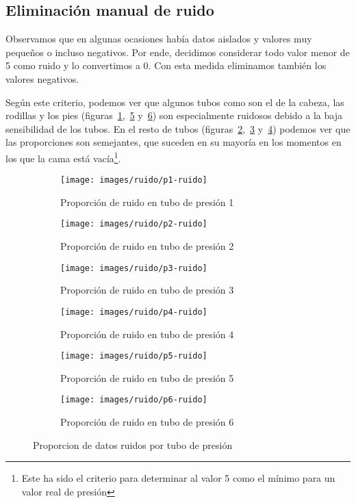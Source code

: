 \documentclass[a4paper,12pt,twoside,oldfontcommands]{memoir}
\begin{document}
	\subsection{Eliminación manual de ruido}
	Observamos que en algunas ocasiones había datos aislados y valores muy pequeños o incluso negativos. Por ende, decidimos considerar todo valor menor de 5 como ruido y lo convertimos a 0. Con esta medida eliminamos también los valores negativos.
	
	Según este criterio, podemos ver que algunos tubos como son el de la cabeza, las rodillas y los pies (figuras~\ref{fig:p1_ruido},~\ref{fig:p5_ruido} y~\ref{fig:p6_ruido}) son especialmente ruidosos debido a la baja sensibilidad de los tubos. En el resto de tubos (figuras~\ref{fig:p2_ruido},~\ref{fig:p3_ruido} y~\ref{fig:p4_ruido}) podemos ver que las proporciones son semejantes, que suceden en su mayoría en los momentos en los que la cama está vacía\footnote{Este ha sido el criterio para determinar al valor 5 como el mínimo para un valor real de presión}.
	
	\begin{figure}
		\centering
		\begin{subfigure}[b]{0.45\textwidth}
			\texttt{[image: images/ruido/p1-ruido]}
			\caption{Proporción de ruido en tubo de presión 1}
			\label{fig:p1_ruido}
		\end{subfigure}
		\begin{subfigure}[b]{0.45\textwidth}
			\texttt{[image: images/ruido/p2-ruido]}
			\caption{Proporción de ruido en tubo de presión 2}
			\label{fig:p2_ruido}
		\end{subfigure}
		\begin{subfigure}[b]{0.45\textwidth}
			\texttt{[image: images/ruido/p3-ruido]}
			\caption{Proporción de ruido en tubo de presión 3}
			\label{fig:p3_ruido}
		\end{subfigure}
		\begin{subfigure}[b]{0.45\textwidth}
			\texttt{[image: images/ruido/p4-ruido]}
			\caption{Proporción de ruido en tubo de presión 4}
			\label{fig:p4_ruido}
		\end{subfigure}
		\begin{subfigure}[b]{0.45\textwidth}
			\texttt{[image: images/ruido/p5-ruido]}
			\caption{Proporción de ruido en tubo de presión 5}
			\label{fig:p5_ruido}
		\end{subfigure}
		\begin{subfigure}[b]{0.45\textwidth}
			\texttt{[image: images/ruido/p6-ruido]}
			\caption{Proporción de ruido en tubo de presión 6}
			\label{fig:p6_ruido}
		\end{subfigure}
		\caption{Proporcion de datos ruidos por tubo de presión}
		\label{fig:ruidos_tubos}
	\end{figure}
	
\end{document}
